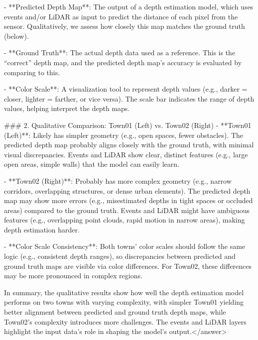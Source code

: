 - **Predicted Depth Map**:  
  The output of a depth estimation model, which uses events and/or LiDAR as input to predict the distance of each pixel from the sensor. Qualitatively, we assess how closely this map matches the ground truth (below).  

- **Ground Truth**:  
  The actual depth data used as a reference. This is the “correct” depth map, and the predicted depth map’s accuracy is evaluated by comparing to this.  

- **Color Scale**:  
  A visualization tool to represent depth values (e.g., darker = closer, lighter = farther, or vice versa). The scale bar indicates the range of depth values, helping interpret the depth maps.  


### 2. Qualitative Comparison: Town01 (Left) vs. Town02 (Right)  
- **Town01 (Left)**:  
  Likely has simpler geometry (e.g., open spaces, fewer obstacles). The predicted depth map probably aligns closely with the ground truth, with minimal visual discrepancies. Events and LiDAR show clear, distinct features (e.g., large open areas, simple walls) that the model can easily learn.  

- **Town02 (Right)**:  
  Probably has more complex geometry (e.g., narrow corridors, overlapping structures, or dense urban elements). The predicted depth map may show more errors (e.g., misestimated depths in tight spaces or occluded areas) compared to the ground truth. Events and LiDAR might have ambiguous features (e.g., overlapping point clouds, rapid motion in narrow areas), making depth estimation harder.  

- **Color Scale Consistency**:  
  Both towns’ color scales should follow the same logic (e.g., consistent depth ranges), so discrepancies between predicted and ground truth maps are visible via color differences. For Town02, these differences may be more pronounced in complex regions.  


In summary, the qualitative results show how well the depth estimation model performs on two towns with varying complexity, with simpler Town01 yielding better alignment between predicted and ground truth depth maps, while Town02’s complexity introduces more challenges. The events and LiDAR layers highlight the input data’s role in shaping the model’s output.</answer>